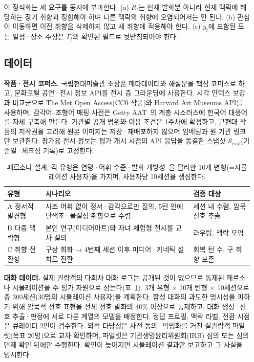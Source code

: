 \documentclass[10pt,twocolumn,letterpaper]{article}
\newcommand{\cS}{\mathcal{S}}
\begin{document}
이 정식화는 세 요구를 동시에 부과한다. (a) $R_t$는 현재 발화뿐 아니라 현재 맥락에 해당하는 장기 취향과 정합해야 하며 다른 맥락의 취향에 오염되어서는 안 된다. (b) 관심이 이동하면 이전 취향을 삭제하지 않고 새 취향에 적응해야 한다. (c) $y_t$에 포함된 모든 일정·장소 주장은 $\Gamma_t$의 확인된 필드로 뒷받침되어야 한다.

\subsection{데이터}
\textbf{작품·전시 코퍼스.} 국립현대미술관 소장품 메타데이터와 해설문을 핵심 코퍼스로 하고, 문화포털 공연·전시 정보 API를 전시 층 그라운딩에 사용한다. 시각 인덱스 보강과 비교군으로 The Met Open Access(CC0 작품)와 Harvard Art Museums API를 사용하며, 감각어–조형어 매핑 사전은 Getty AAT~\cite{getty_aat}의 계층 시소러스에 한국어 대응어를 자체 구축해 만든다. 기관별 공개 범위와 이용 조건은 1주차에 확정하고, 근현대 작품의 저작권을 고려해 원본 이미지는 저장·재배포하지 않으며 임베딩과 원 기관 링크만 보관한다. 평가용 전시 정보는 평가 개시 시점의 API 응답을 동결한 스냅샷 $\cS_{\mathrm{eval}}$(기준일·체크섬 기록)로 고정한다.

\begin{table}[t]
\centering\small
\setlength{\tabcolsep}{3.5pt}
\begin{tabularx}{\columnwidth}{@{}l>{\raggedright\arraybackslash}X>{\raggedright\arraybackslash}p{2.2cm}@{}}
\toprule
유형 & 시나리오 & 검증 대상 \\
\midrule
A 정서적 발견형 & 사조 어휘 없이 정서·감각으로만 질의, 5턴 안에 단색조·물질성 취향으로 수렴 & 세션 내 수렴, 암묵 신호 추출 \\
B 다중 맥락형 & 본인 연구(미디어아트)와 자녀 체험형 전시를 교차 질의 & 라우팅, 맥락 오염 \\
C 취향 전환형 & 구상 회화 → 4번째 세션 이후 미디어·키네틱 설치로 전환 & 회복 턴 수, 구 취향 보존 \\
\bottomrule
\end{tabularx}
\caption{페르소나 설계. 각 유형은 연령·어휘 수준·발화 개방성~\cite{kim2025csi}을 달리한 10개 변형(=시뮬레이션 사용자)을 가지며, 사용자당 10세션을 생성한다.}
\label{tab:persona}
\end{table}

\textbf{대화 데이터.} 실제 관람객의 다회차 대화 로그는 공개된 것이 없으므로 통제된 페르소나 시뮬레이션을 주 평가 자원으로 삼는다(표~\ref{tab:persona}). 3개 유형 × 10개 변형 × 10세션으로 총 300세션(30명의 시뮬레이션 사용자)을 계획한다. 합성 대화의 과도한 명시성을 피하기 위해 암묵적 선호 표현을 전체 선호 발화의 40\% 이상으로 통제하고, 대화 생성·신호 추출·판정에 서로 다른 계열의 모델을 배정한다. 정답 프로필, 맥락 라벨, 전환 시점은 큐레이터 2인이 검수한다. 외적 타당성은 사전 동의·익명화를 거친 실관람객 파일럿(목표 20명)으로 교차 확인하며, 파일럿은 기관생명윤리위원회(IRB) 심의 또는 심의 면제 확인 뒤에만 수행한다. 확인이 늦어지면 시뮬레이션 결과만 보고하고 그 사실을 명시한다.
\end{document}
